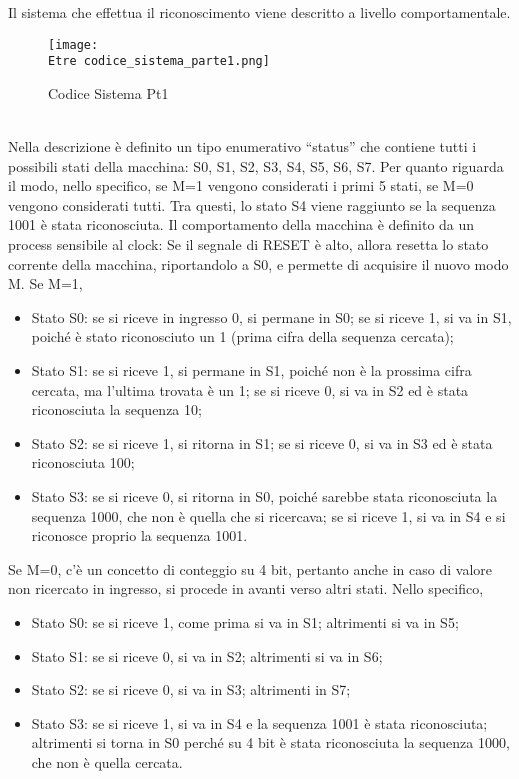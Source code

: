 \documentclass[12pt]{article}
\def \Etre {Allegati/Esercizio3/}
\begin{document}
Il sistema che effettua il riconoscimento viene descritto a livello comportamentale.
\begin{figure}[ht]
    \centering
    \texttt{[image: \\Etre codice\_sistema\_parte1.png]}
    \caption{Codice Sistema Pt1}
\end{figure}
\\Nella descrizione è definito un tipo enumerativo “status” che contiene tutti i possibili stati della macchina: S0, S1, S2, S3, S4, S5, S6, S7. Per quanto riguarda il modo, nello specifico, se M=1 vengono considerati i primi 5 stati, se M=0 vengono considerati tutti.
Tra questi, lo stato S4 viene raggiunto se la sequenza 1001 è stata riconosciuta.
Il comportamento della macchina è definito da un process sensibile al clock:
Se il segnale di RESET è alto, allora resetta lo stato corrente della macchina, riportandolo a S0, e permette di acquisire il nuovo modo M.
Se M=1,
\begin{itemize}
    \item Stato S0: se si riceve in ingresso 0, si permane in S0; se si riceve 1, si va in S1, poiché è stato riconosciuto un 1 (prima cifra della sequenza cercata);
    \item Stato S1: se si riceve 1, si permane in S1, poiché non è la prossima cifra cercata, ma l’ultima trovata è un 1; se si riceve 0, si va in S2 ed è stata riconosciuta la sequenza 10;
    \item Stato S2: se si riceve 1, si ritorna in S1; se si riceve 0, si va in S3 ed è stata riconosciuta 100;
    \item Stato S3: se si riceve 0, si ritorna in S0, poiché sarebbe stata riconosciuta la sequenza 1000, che non è quella che si ricercava; se si riceve 1, si va in S4 e si riconosce proprio la sequenza 1001.
\end{itemize}
Se M=0, c’è un concetto di conteggio su 4 bit, pertanto anche in caso di valore non ricercato in ingresso, si procede in avanti verso altri stati. Nello specifico,
\begin{itemize}
    \item Stato S0: se si riceve 1, come prima si va in S1; altrimenti si va in S5;
    \item Stato S1: se si riceve 0, si va in S2; altrimenti si va in S6;
    \item Stato S2: se si riceve 0, si va in S3; altrimenti in S7;
    \item Stato S3: se si riceve 1, si va in S4 e la sequenza 1001 è stata riconosciuta; altrimenti si torna in S0 perché su 4 bit è stata riconosciuta la sequenza 1000, che non è quella cercata.
\end{itemize}
\end{document}
